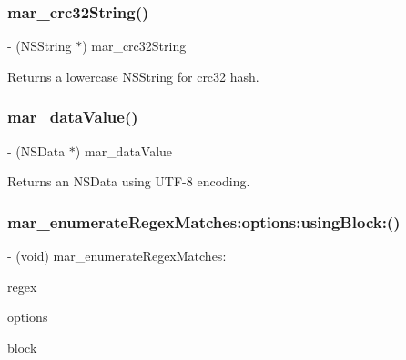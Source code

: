 \subsubsection{\texorpdfstring{mar\+\_\+crc32\+String()}{mar\_crc32String()}}
{\footnotesize\ttfamily -\/ (N\+S\+String $\ast$) mar\+\_\+crc32\+String \begin{DoxyParamCaption}{ }\end{DoxyParamCaption}}

Returns a lowercase N\+S\+String for crc32 hash. \mbox{\label{category_n_s_string_07_m_a_r_e_x_08_a98e0a13c8a61f86719023356a728e10f}} 
\subsubsection{\texorpdfstring{mar\+\_\+data\+Value()}{mar\_dataValue()}}
{\footnotesize\ttfamily -\/ (N\+S\+Data $\ast$) mar\+\_\+data\+Value \begin{DoxyParamCaption}{ }\end{DoxyParamCaption}}

Returns an N\+S\+Data using U\+T\+F-\/8 encoding. \mbox{\label{category_n_s_string_07_m_a_r_e_x_08_a5cdc6996746ed2f11c267fcaf39bd49f}} 
\subsubsection{\texorpdfstring{mar\+\_\+enumerate\+Regex\+Matches\+:options\+:using\+Block\+:()}{mar\_enumerateRegexMatches:options:usingBlock:()}}
{\footnotesize\ttfamily -\/ (void) mar\+\_\+enumerate\+Regex\+Matches\+: \begin{DoxyParamCaption}\item[{(N\+S\+String $\ast$)}]{regex }\item[{options:(N\+S\+Regular\+Expression\+Options)}]{options }\item[{usingBlock:(void($^\wedge$)(N\+S\+String $\ast$match, N\+S\+Range match\+Range, B\+O\+OL $\ast$stop))}]{block }\end{DoxyParamCaption}}

